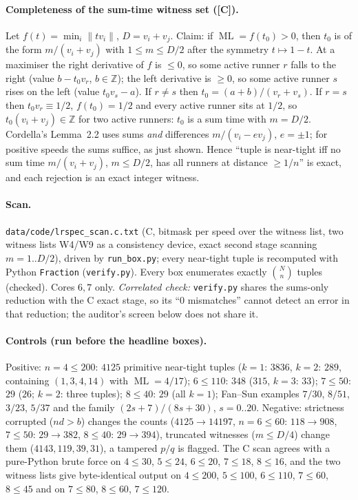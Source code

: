 \documentclass[10pt]{article}
\newcommand{\tier}[1]{\textsf{[#1]}}
\newcommand{\tC}{\tier{C}}
\newcommand{\ML}{\operatorname{ML}}
\begin{document}
\paragraph{Completeness of the sum-time witness set (\tC{}).} Let $f(t)=\min_i\|tv_i\|$, $D=v_i+v_j$. Claim: if $\ML=f(t_0)>0$, then $t_0$ is of the form $m/(v_i+v_j)$ with $1\le m\le D/2$ after the symmetry $t\mapsto1-t$. At a maximiser the right derivative of $f$ is $\le0$, so some active runner $r$ falls to the right (value $b-t_0v_r$, $b\in\mathbb Z$); the left derivative is $\ge0$, so some active runner $s$ rises on the left (value $t_0v_s-a$). If $r\ne s$ then $t_0=(a+b)/(v_r+v_s)$. If $r=s$ then $t_0v_r\equiv1/2$, $f(t_0)=1/2$ and every active runner sits at $1/2$, so $t_0(v_i+v_j)\in\mathbb Z$ for two active runners: $t_0$ is a sum time with $m=D/2$. Cordella's Lemma~2.2 uses sums \emph{and} differences $m/(v_i-ev_j)$, $e=\pm1$; for positive speeds the sums suffice, as just shown. Hence ``tuple is near-tight iff no sum time $m/(v_i+v_j)$, $m\le D/2$, has all runners at distance $\ge1/n$'' is exact, and each rejection is an exact integer witness.

\paragraph{Scan.} \texttt{data/code/lrspec\_scan.c.txt} (C, bitmask per speed over the witness list, two witness lists W4/W9 as a consistency device, exact second stage scanning $m=1..D/2$), driven by \texttt{run\_box.py}; every near-tight tuple is recomputed with Python \texttt{Fraction} (\texttt{verify.py}). Every box enumerates exactly $\binom Nn$ tuples (checked). Cores $6,7$ only. \emph{Correlated check:} \texttt{verify.py} shares the sums-only reduction with the C exact stage, so its ``0 mismatches'' cannot detect an error in that reduction; the auditor's screen below does not share it.

\paragraph{Controls (run before the headline boxes).} Positive: $n=4\le200$: $4125$ primitive near-tight tuples ($k=1$: $3836$, $k=2$: $289$, containing $(1,3,4,14)$ with $\ML=4/17$); $6\le110$: $348$ ($315$, $k=3$: $33$); $7\le50$: $29$ ($26$; $k=2$: three tuples); $8\le40$: $29$ (all $k=1$); Fan--Sun examples $7/30$, $8/51$, $3/23$, $5/37$ and the family $(2s+7)/(8s+30)$, $s=0..20$. Negative: strictness corrupted ($n d>b$) changes the counts ($4125\to14197$, $n=6\le60$: $118\to908$, $7\le50$: $29\to382$, $8\le40$: $29\to394$), truncated witnesses ($m\le D/4$) change them ($4143,119,39,31$), a tampered $p/q$ is flagged. The C scan agrees with a pure-Python brute force on $4\le30$, $5\le24$, $6\le20$, $7\le18$, $8\le16$, and the two witness lists give byte-identical output on $4\le200$, $5\le100$, $6\le110$, $7\le60$, $8\le45$ and on $7\le80$, $8\le60$, $7\le120$.
\end{document}
